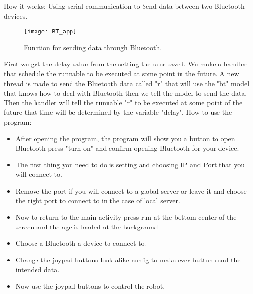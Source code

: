 	How it works:
		Using serial communication to Send data between two Bluetooth devices.
		\begin{figure}[h]		
			\centering
			\texttt{[image: BT\_app]}
			\caption{Function for sending data through Bluetooth.}
			\label{Fig:BT}
		\end{figure}
		
		First we get the delay value from the setting the user saved.
		We make a handler that schedule the runnable to be executed at some point in the future.
		A new thread is made to send the Bluetooth data called "r" that will use the "bt" model that knows how to deal with Bluetooth then we tell the model to send the data.
		Then the handler will tell the runnable "r" to be executed at some point of the future that time will be determined by the variable "delay".
	How to use the program:
	\begin{itemize}
		\item After opening the program, the program will show you a button to open Bluetooth press "turn on" and confirm opening Bluetooth for your device.
		\item The first thing you need to do is setting and choosing IP and Port that you will connect to.
		\item Remove the port if you will connect to a global server or leave it and choose the right port to connect to in the case of local server.
		\item Now to return to the main activity press run at the bottom-center of the screen and the age is loaded at the background.
		\item Choose a Bluetooth a device to connect to.
		\item Change the joypad buttons look alike config to make ever button send the intended data.
		\item Now use the joypad buttons to control the robot.
	\end{itemize}
		
